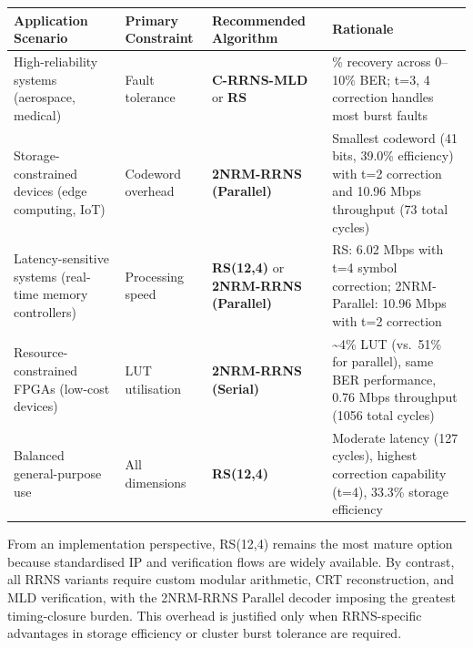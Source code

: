 {\def\LTcaptype{none} %
\begin{longtable}[]{@{}
  >{\raggedright\arraybackslash}p{}
  >{\raggedright\arraybackslash}p{}
  >{\raggedright\arraybackslash}p{}
  >{\raggedright\arraybackslash}p{}@{}}
\toprule\noalign{}
\begin{minipage}[b]{\linewidth}\raggedright
Application Scenario
\end{minipage} & \begin{minipage}[b]{\linewidth}\raggedright
Primary Constraint
\end{minipage} & \begin{minipage}[b]{\linewidth}\raggedright
Recommended Algorithm
\end{minipage} & \begin{minipage}[b]{\linewidth}\raggedright
Rationale
\end{minipage} \\
\midrule\noalign{}
\endhead
\bottomrule\noalign{}
\endlastfoot
High-reliability systems (aerospace, medical) & Fault tolerance &
\textbf{C-RRNS-MLD} or \textbf{RS} & 100\% recovery across 0--10\% BER;
t=3, 4 correction handles most burst faults \\
Storage-constrained devices (edge computing, IoT) & Codeword overhead &
\textbf{2NRM-RRNS (Parallel)} & Smallest codeword (41 bits, 39.0\%
efficiency) with t=2 correction and 10.96 Mbps throughput (73 total
cycles) \\
Latency-sensitive systems (real-time memory controllers) & Processing
speed & \textbf{RS(12,4)} or \textbf{2NRM-RRNS (Parallel)} & RS: 6.02
Mbps with t=4 symbol correction; 2NRM-Parallel: 10.96 Mbps with t=2
correction \\
Resource-constrained FPGAs (low-cost devices) & LUT utilisation &
\textbf{2NRM-RRNS (Serial)} & \textasciitilde4\% LUT (vs.~51\% for
parallel), same BER performance, 0.76 Mbps throughput (1056 total
cycles) \\
Balanced general-purpose use & All dimensions & \textbf{RS(12,4)} &
Moderate latency (127 cycles), highest correction capability (t=4),
33.3\% storage efficiency \\
\end{longtable}
}

From an implementation perspective, RS(12,4) remains the most mature
option because standardised IP and verification flows are widely
available. By contrast, all RRNS variants require custom modular
arithmetic, CRT reconstruction, and MLD verification, with the 2NRM-RRNS
Parallel decoder imposing the greatest timing-closure burden. This
overhead is justified only when RRNS-specific advantages in storage
efficiency or cluster burst tolerance are required.

